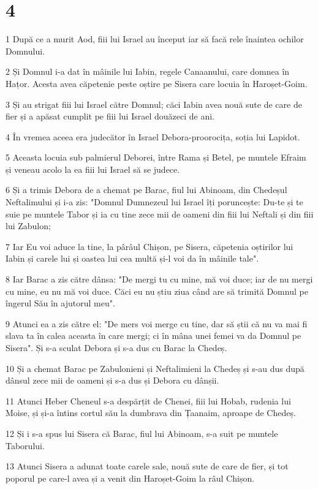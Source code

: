 \chapter{4}

\par 1 După ce a murit Aod, fiii lui Israel au început iar să facă rele înaintea ochilor Domnului.
\par 2 Și Domnul i-a dat în mâinile lui Iabin, regele Canaanului, care domnea în Hațor. Acesta avea căpetenie peste oștire pe Sisera care locuia în Haroșet-Goim.
\par 3 Și au strigat fiii lui Israel către Domnul; căci Iabin avea nouă sute de care de fier și a apăsat cumplit pe fiii lui Israel douăzeci de ani.
\par 4 În vremea aceea era judecător în Israel Debora-proorocița, soția lui Lapidot.
\par 5 Aceasta locuia sub palmierul Deborei, între Rama și Betel, pe muntele Efraim și veneau acolo la ea fiii lui Israel să se judece.
\par 6 Și a trimis Debora de a chemat pe Barac, fiul lui Abinoam, din Chedeșul Neftalimului și i-a zis: "Domnul Dumnezeul lui Israel îți poruncește: Du-te și te suie pe muntele Tabor și ia cu tine zece mii de oameni din fiii lui Neftali și din fiii lui Zabulon;
\par 7 Iar Eu voi aduce la tine, la pârâul Chișon, pe Sisera, căpetenia oștirilor lui Iabin și carele lui și oastea lui cea multă și-l voi da în mâinile tale".
\par 8 Iar Barac a zis către dânsa: "De mergi tu cu mine, mă voi duce; iar de nu mergi cu mine, eu nu mă voi duce. Căci eu nu știu ziua când are să trimită Domnul pe îngerul Său în ajutorul meu".
\par 9 Atunci ea a zis către el: "De mers voi merge cu tine, dar să știi că nu va mai fi slava ta în calea aceasta în care mergi; ci în mâna unei femei va da Domnul pe Sisera". Și s-a sculat Debora și s-a dus cu Barac la Chedeș.
\par 10 Și a chemat Barac pe Zabulonieni și Neftalimieni la Chedeș și s-au dus după dânsul zece mii de oameni și s-a dus și Debora cu dânșii.
\par 11 Atunci Heber Cheneul s-a despărțit de Chenei, fiii lui Hobab, rudenia lui Moise, și și-a întins cortul său la dumbrava din Țaanaim, aproape de Chedeș.
\par 12 Și i s-a spus lui Sisera că Barac, fiul lui Abinoam, s-a suit pe muntele Taborului.
\par 13 Atunci Sisera a adunat toate carele sale, nouă sute de care de fier, și tot poporul pe care-l avea și a venit din Haroșet-Goim la râul Chișon.
